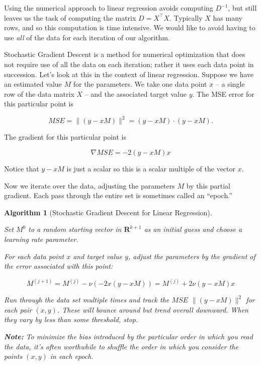 \documentclass[
  11pt,
  letterpaper,
]{scrbook}
\newcommand{\R}{\mathbf{R}}
\theoremstyle{plain}
\newtheorem{algorithm}{Algorithm}[chapter]
\theoremstyle{plain}
\theoremstyle{remark}
\begin{document}
Using the numerical approach to linear regression avoids computing
\(D^{-1}\), but still leaves us the task of computing the matrix
\(D=X^{\intercal}X\). Typically \(X\) has many rows, and so this
computation is time intensive. We would like to avoid having to use
\emph{all} of the data for each iteration of our algorithm.

Stochastic Gradient Descent is a method for numerical optimization that
does not require use of all the data on each iteration; rather it uses
each data point in succession. Let's look at this in the context of
linear regression. Suppose we have an estimated value \(M\) for the
parameters. We take one data point \(x\) -- a single row of the data
matrix \(X\) -- and the associated target value \(y\). The MSE error for
this particular point is

\[
MSE = \| (y-xM)\|^2 = (y-xM)\cdot (y-xM).
\]

The gradient for this particular point is

\[
\nabla MSE = -2(y-xM)x
\]

Notice that \(y-xM\) is just a scalar so this is a scalar multiple of
the vector \(x\).

Now we iterate over the data, adjusting the parameters \(M\) by this
partial gradient. Each pass through the entire set is sometimes called
an ``epoch.''

\leavevmode{}%
\begin{algorithm}[Stochastic Gradient Descent for Linear
Regression]\label{alg-stochastic-sgd}

Set \(M^{0}\) to a random starting vector in \(\R^{k+1}\) as an initial
guess and choose a learning rate parameter.

For each data point \(x\) and target value \(y\), adjust the parameters
by the gradient of the error associated with this point:

\[
M^{(j+1)} = M^{(j)}-\nu(-2x(y-xM)) = M^{(j)}+2\nu(y-xM)x
\]

Run through the data set multiple times and track the \(MSE\)
\(\|(y-xM)\|^2\) for each pair \((x,y)\). These will bounce around but
trend overall downward. When they vary by less than some threshold,
stop.

\textbf{Note:} To minimize the bias introduced by the particular order
in which you read the data, it's often worthwhile to shuffle the order
in which you consider the points \((x,y)\) in each epoch.

\end{algorithm}
\end{document}

